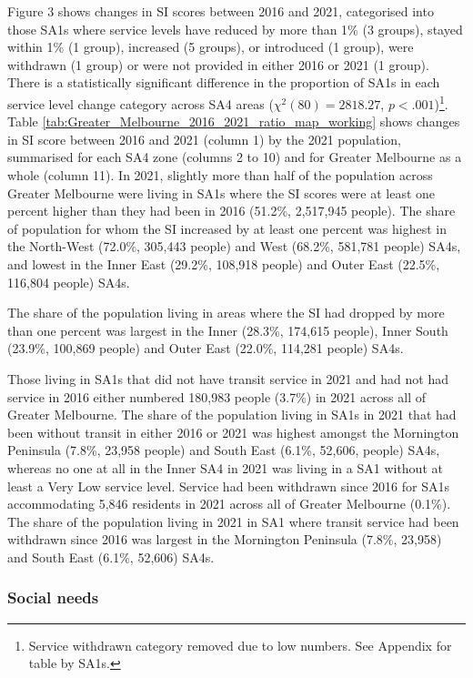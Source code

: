 \documentclass[preprint, 3p,
authoryear]{elsarticle} %
\begin{document}
Figure 3 shows changes in SI scores between 2016 and 2021, categorised
into those SA1s where service levels have reduced by more than 1\% (3
groups), stayed within 1\% (1 group), increased (5 groups), or
introduced (1 group), were withdrawn (1 group) or were not provided in
either 2016 or 2021 (1 group). There is a statistically significant
difference in the proportion of SA1s in each service level change
category across SA4 areas (\(\chi^2(80) = 2818.27\),
\(p < .001\))\footnote{Service withdrawn category removed due to low
  numbers. See Appendix for table by SA1s.}. Table
\ref{tab:Greater_Melbourne_2016_2021_ratio_map_working} shows changes in
SI score between 2016 and 2021 (column 1) by the 2021 population,
summarised for each SA4 zone (columns 2 to 10) and for Greater Melbourne
as a whole (column 11). In 2021, slightly more than half of the
population across Greater Melbourne were living in SA1s where the SI
scores were at least one percent higher than they had been in 2016
(51.2\%, 2,517,945 people). The share of population for whom the SI
increased by at least one percent was highest in the North-West (72.0\%,
305,443 people) and West (68.2\%, 581,781 people) SA4s, and lowest in
the Inner East (29.2\%, 108,918 people) and Outer East (22.5\%, 116,804
people) SA4s.

The share of the population living in areas where the SI had dropped by
more than one percent was largest in the Inner (28.3\%, 174,615 people),
Inner South (23.9\%, 100,869 people) and Outer East (22.0\%, 114,281
people) SA4s.

Those living in SA1s that did not have transit service in 2021 and had
not had service in 2016 either numbered 180,983 people (3.7\%) in 2021
across all of Greater Melbourne. The share of the population living in
SA1s in 2021 that had been without transit in either 2016 or 2021 was
highest amongst the Mornington Peninsula (7.8\%, 23,958 people) and
South East (6.1\%, 52,606, people) SA4s, whereas no one at all in the
Inner SA4 in 2021 was living in a SA1 without at least a Very Low
service level. Service had been withdrawn since 2016 for SA1s
accommodating 5,846 residents in 2021 across all of Greater Melbourne
(0.1\%). The share of the population living in 2021 in SA1 where transit
service had been withdrawn since 2016 was largest in the Mornington
Peninsula (7.8\%, 23,958) and South East (6.1\%, 52,606) SA4s.

\subsubsection{Social needs}\label{social-needs}
\end{document}
